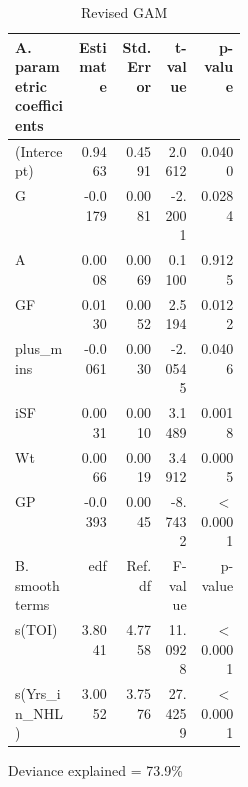 \documentclass[10pt]{article}
\begin{document}
{{{{\begin{table}[tph]
\centering
\caption{Revised GAM} 
\label{tab.gam.revised}
\begin{threeparttable}
\begin{tabular}[t]{L{0.27\linewidth}rrrr} 
   \toprule
A. parametric coefficients & Estimate & Std. Error & t-value & p-value \\  
  \midrule
  (Intercept) & 0.9463 & 0.4591 & 2.0612 & 0.0400 \\ 
  G & -0.0179 & 0.0081 & -2.2001 & 0.0284 \\ 
  A & 0.0008 & 0.0069 & 0.1100 & 0.9125 \\ 
  GF & 0.0130 & 0.0052 & 2.5194 & 0.0122 \\ 
  plus\_mins & -0.0061 & 0.0030 & -2.0545 & 0.0406 \\ 
  iSF & 0.0031 & 0.0010 & 3.1489 & 0.0018 \\ 
  Wt & 0.0066 & 0.0019 & 3.4912 & 0.0005 \\ 
  GP & -0.0393 & 0.0045 & -8.7432 & $<$ 0.0001 \\ 
   \midrule
B. smooth terms & edf & Ref.df & F-value & p-value \\ 
  \midrule
  s(TOI) & 3.8041 & 4.7758 & 11.0928 & $<$ 0.0001 \\ 
  s(Yrs\_in\_NHL) & 3.0052 & 3.7576 & 27.4259 & $<$ 0.0001 \\ 
   \bottomrule
\end{tabular}
    \begin{tablenotes}
      \item Deviance explained = 73.9\%
    \end{tablenotes}
  \end{threeparttable}    
\end{table}



}}}}
\end{document}
